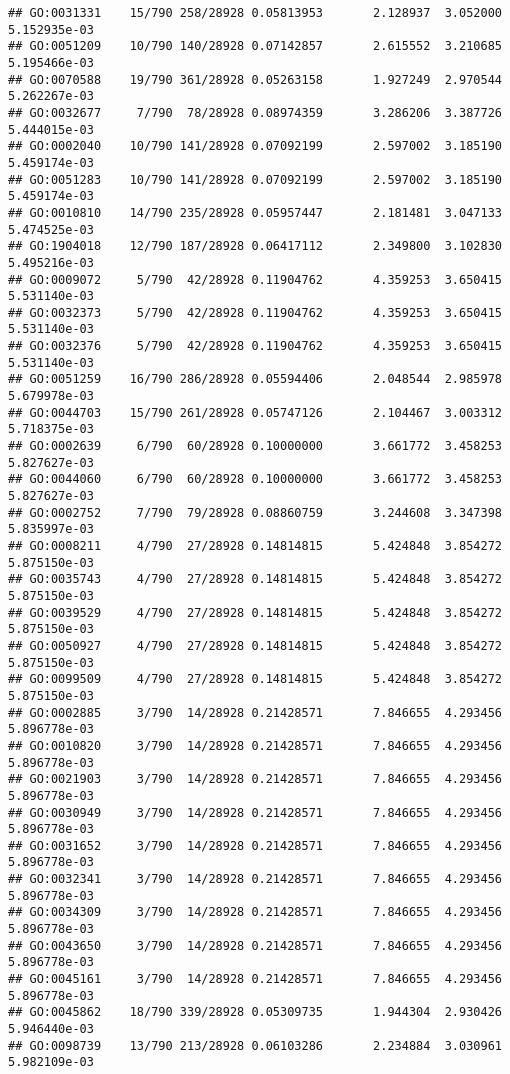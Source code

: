 \documentclass[
]{article}
\begin{document}
\begin{verbatim}
## GO:0031331    15/790 258/28928 0.05813953       2.128937  3.052000 5.152935e-03
## GO:0051209    10/790 140/28928 0.07142857       2.615552  3.210685 5.195466e-03
## GO:0070588    19/790 361/28928 0.05263158       1.927249  2.970544 5.262267e-03
## GO:0032677     7/790  78/28928 0.08974359       3.286206  3.387726 5.444015e-03
## GO:0002040    10/790 141/28928 0.07092199       2.597002  3.185190 5.459174e-03
## GO:0051283    10/790 141/28928 0.07092199       2.597002  3.185190 5.459174e-03
## GO:0010810    14/790 235/28928 0.05957447       2.181481  3.047133 5.474525e-03
## GO:1904018    12/790 187/28928 0.06417112       2.349800  3.102830 5.495216e-03
## GO:0009072     5/790  42/28928 0.11904762       4.359253  3.650415 5.531140e-03
## GO:0032373     5/790  42/28928 0.11904762       4.359253  3.650415 5.531140e-03
## GO:0032376     5/790  42/28928 0.11904762       4.359253  3.650415 5.531140e-03
## GO:0051259    16/790 286/28928 0.05594406       2.048544  2.985978 5.679978e-03
## GO:0044703    15/790 261/28928 0.05747126       2.104467  3.003312 5.718375e-03
## GO:0002639     6/790  60/28928 0.10000000       3.661772  3.458253 5.827627e-03
## GO:0044060     6/790  60/28928 0.10000000       3.661772  3.458253 5.827627e-03
## GO:0002752     7/790  79/28928 0.08860759       3.244608  3.347398 5.835997e-03
## GO:0008211     4/790  27/28928 0.14814815       5.424848  3.854272 5.875150e-03
## GO:0035743     4/790  27/28928 0.14814815       5.424848  3.854272 5.875150e-03
## GO:0039529     4/790  27/28928 0.14814815       5.424848  3.854272 5.875150e-03
## GO:0050927     4/790  27/28928 0.14814815       5.424848  3.854272 5.875150e-03
## GO:0099509     4/790  27/28928 0.14814815       5.424848  3.854272 5.875150e-03
## GO:0002885     3/790  14/28928 0.21428571       7.846655  4.293456 5.896778e-03
## GO:0010820     3/790  14/28928 0.21428571       7.846655  4.293456 5.896778e-03
## GO:0021903     3/790  14/28928 0.21428571       7.846655  4.293456 5.896778e-03
## GO:0030949     3/790  14/28928 0.21428571       7.846655  4.293456 5.896778e-03
## GO:0031652     3/790  14/28928 0.21428571       7.846655  4.293456 5.896778e-03
## GO:0032341     3/790  14/28928 0.21428571       7.846655  4.293456 5.896778e-03
## GO:0034309     3/790  14/28928 0.21428571       7.846655  4.293456 5.896778e-03
## GO:0043650     3/790  14/28928 0.21428571       7.846655  4.293456 5.896778e-03
## GO:0045161     3/790  14/28928 0.21428571       7.846655  4.293456 5.896778e-03
## GO:0045862    18/790 339/28928 0.05309735       1.944304  2.930426 5.946440e-03
## GO:0098739    13/790 213/28928 0.06103286       2.234884  3.030961 5.982109e-03

\end{verbatim}
\end{document}
